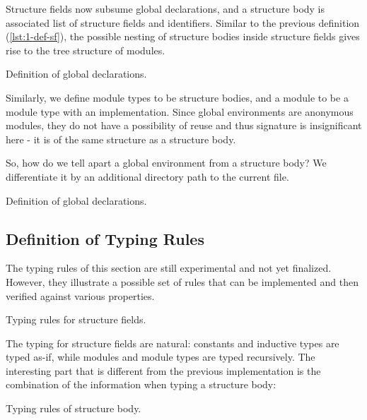 Structure fields now subsume global declarations, and a structure body is
associated list of structure fields and identifiers. Similar to the previous
definition (\ref{lst:1-def-sf}), the possible nesting of structure bodies inside
structure fields gives rise to the tree structure of modules.

\begin{listing}[H]
  \caption{Definition of global declarations.}
  \label{lst:2-def-gd}
\end{listing}

Similarly, we define module types to be structure bodies, and a module to be a
module type with an implementation. Since global environments are anonymous
modules, they do not have a possibility of reuse and thus signature is
insignificant here - it is of the same structure as a structure body.

So, how do we tell apart a global environment from a structure body? We
differentiate it by an additional directory path to the current file.

\begin{listing}[H]
  \caption{Definition of global declarations.}
  \label{lst:2-def-env}
\end{listing}

\subsection{Definition of Typing Rules}
The typing rules of this section are still experimental and not yet finalized.
However, they illustrate a possible set of rules that can be implemented and
then verified against various properties.

\begin{listing}[H]
  \caption{Typing rules for structure fields.}
  \label{lst:2-typing-sf}
\end{listing}

The typing for structure fields are natural: constants and inductive types are
typed as-if, while modules and module types are typed recursively. The
interesting part that is different from the previous implementation is the
combination of the information when typing a structure body:

\begin{listing}[H]
  \caption{Typing rules of structure body.}
  \label{lst:2-typing-sb}
\end{listing}

